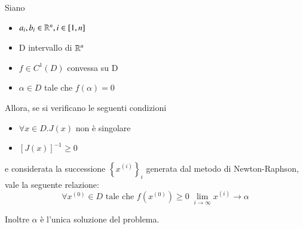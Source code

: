 \begin{theo}
Siano
\begin{itemize}
\item $ a_i, b_i \in \mathbb{R}^n, i \in [1,n] $
\item D intervallo di $ \mathbb{R}^n $
\item $ f \in C^1(D) $ convessa su D
\item $ \alpha \in D $ tale che $ f(\alpha) = 0 $
\end{itemize}

Allora, se si verificano le seguenti condizioni
\begin{itemize}
\item $ \forall x \in D. J(x) $ non \`e  singolare
\item $ [J(x)]^{-1} \geq 0 $
\end{itemize}
e considerata la successione $ \left\lbrace x^{(i)} \right\rbrace_i $ generata dal metodo di Newton-Raphson, vale la seguente relazione:
\[ \forall x^{(0)} \in D \text{ tale che } f(x^{(0)}) \geq 0 \; \lim_{i \to \infty} x^{(i)} \rightarrow \alpha \]

Inoltre $ \alpha $ \`e  l'unica soluzione del problema.
\end{theo}

